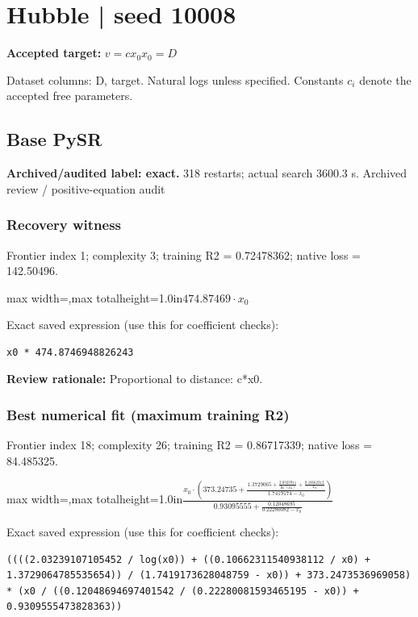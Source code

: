 \documentclass[10pt,letterpaper,landscape]{article}
\begin{document}
\section*{Hubble | seed 10008}
\textbf{Accepted target:} $\displaystyle v=c x_0$\hfill $x_0=D$\par
{\small Dataset columns: D, target. Natural logs unless specified. Constants $c_i$ denote the accepted free parameters.}\par\medskip
\begin{minipage}[t]{0.485\textwidth}
\subsection*{Base PySR}
\textbf{Archived/audited label: exact.} 318 restarts; actual search 3600.3 s.
{\small Archived review / positive-equation audit}
\subsubsection*{Recovery witness}
Frontier index 1; complexity 3; training R2 = 0.72478362; native loss = 142.50496.
\begin{center}\begin{adjustbox}{max width=\linewidth,max totalheight=1.0in}$\displaystyle 474.87469 \cdot x_{0}$\end{adjustbox}\end{center}
{\scriptsize Exact saved expression (use this for coefficient checks):}
\begin{lstlisting}
x0 * 474.8746948826243
\end{lstlisting}
{\small\textbf{Review rationale:} Proportional to distance: c*x0.}
\subsubsection*{Best numerical fit (maximum training R2)}
Frontier index 18; complexity 26; training R2 = 0.86717339; native loss = 84.485325.
\begin{center}\begin{adjustbox}{max width=\linewidth,max totalheight=1.0in}$\displaystyle \frac{x_{0} \cdot \left(373.24735 + \frac{1.3729065 + \frac{2.0323911}{\ln{\left(x_{0} \right)}} + \frac{0.10662312}{x_{0}}}{1.7419174 - x_{0}}\right)}{0.93095555 + \frac{0.12048695}{0.22280082 - x_{0}}}$\end{adjustbox}\end{center}
{\scriptsize Exact saved expression (use this for coefficient checks):}
\begin{lstlisting}
((((2.03239107105452 / log(x0)) + ((0.10662311540938112 / x0) + 1.3729064785535654)) / (1.7419173628048759 - x0)) + 373.2473536969058) * (x0 / ((0.12048694697401542 / (0.22280081593465195 - x0)) + 0.9309555473828363))
\end{lstlisting}
\end{minipage}\hfill
\end{document}
